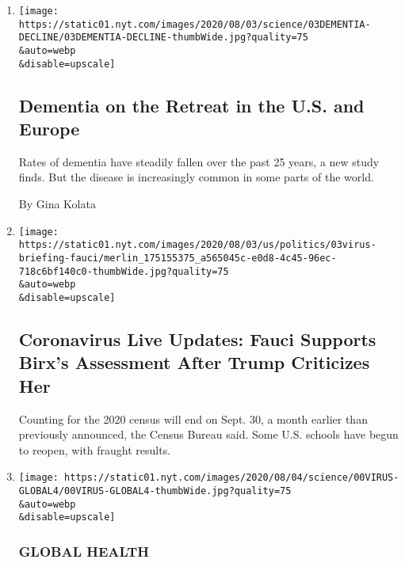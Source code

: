 \begin{enumerate}
\def\labelenumi{\arabic{enumi}.}
\item
  \href{/2020/08/03/health/alzheimers-dementia-rates.html}{}

  \texttt{[image: https://static01.nyt.com/images/2020/08/03/science/03DEMENTIA-DECLINE/03DEMENTIA-DECLINE-thumbWide.jpg?quality=75\\\&auto=webp\\\&disable=upscale]}

  \hypertarget{dementia-on-the-retreat-in-the-us-and-europe}{%
  \subsection{Dementia on the Retreat in the U.S. and
  Europe}\label{dementia-on-the-retreat-in-the-us-and-europe}}

  Rates of dementia have steadily fallen over the past 25 years, a new
  study finds. But the disease is increasingly common in some parts of
  the world.

  By Gina Kolata
\item
  \href{/2020/08/03/world/coronavirus-covid-19.html}{}

  \texttt{[image: https://static01.nyt.com/images/2020/08/03/us/politics/03virus-briefing-fauci/merlin\_175155375\_a565045c-e0d8-4c45-96ec-718c6bf140c0-thumbWide.jpg?quality=75\\\&auto=webp\\\&disable=upscale]}

  \hypertarget{coronavirus-live-updates-fauci-supports-birxs-assessment-after-trump-criticizes-her}{%
  \subsection{Coronavirus Live Updates: Fauci Supports Birx's Assessment
  After Trump Criticizes
  Her}\label{coronavirus-live-updates-fauci-supports-birxs-assessment-after-trump-criticizes-her}}

  Counting for the 2020 census will end on Sept. 30, a month earlier
  than previously announced, the Census Bureau said. Some U.S. schools
  have begun to reopen, with fraught results.
\item
  \href{/2020/08/03/health/coronavirus-tuberculosis-aids-malaria.html}{}

  \texttt{[image: https://static01.nyt.com/images/2020/08/04/science/00VIRUS-GLOBAL4/00VIRUS-GLOBAL4-thumbWide.jpg?quality=75\\\&auto=webp\\\&disable=upscale]}

  \hypertarget{global-health}{%
  \subsubsection{GLOBAL HEALTH}\label{global-health}}


\end{enumerate}
